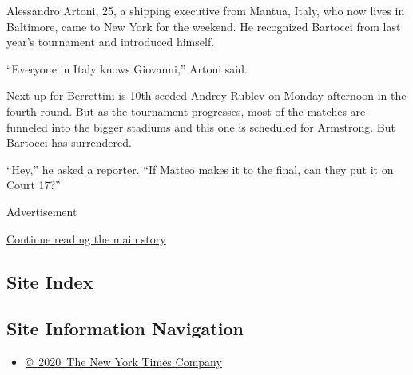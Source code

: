 Alessandro Artoni, 25, a shipping executive from Mantua, Italy, who now
lives in Baltimore, came to New York for the weekend. He recognized
Bartocci from last year's tournament and introduced himself.

``Everyone in Italy knows Giovanni,'' Artoni said.

Next up for Berrettini is 10th-seeded Andrey Rublev on Monday afternoon
in the fourth round. But as the tournament progresses, most of the
matches are funneled into the bigger stadiums and this one is scheduled
for Armstrong. But Bartocci has surrendered.

``Hey,'' he asked a reporter. ``If Matteo makes it to the final, can
they put it on Court 17?''

Advertisement

\protect\hyperlink{after-bottom}{Continue reading the main story}

\hypertarget{site-index}{%
\subsection{Site Index}\label{site-index}}

\hypertarget{site-information-navigation}{%
\subsection{Site Information
Navigation}\label{site-information-navigation}}

\begin{itemize}
\tightlist
\item
  \href{https://help.nytimes3xbfgragh.onion/hc/en-us/articles/115014792127-Copyright-notice}{©~2020~The
  New York Times Company}
\end{itemize}

